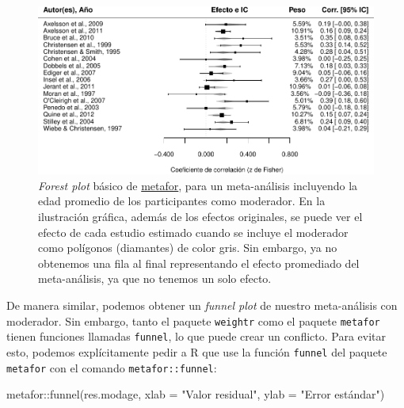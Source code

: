 \documentclass[
  bookmarksnumbered]{article}
\newenvironment{Shaded}{\begin{snugshade}}{\end{snugshade}}
\newcommand{\AttributeTok}[1]{\textcolor[rgb]{0.00,0.34,0.68}{#1}}
\newcommand{\FunctionTok}[1]{\textcolor[rgb]{0.39,0.29,0.61}{#1}}
\newcommand{\NormalTok}[1]{\textcolor[rgb]{0.12,0.11,0.11}{#1}}
\newcommand{\SpecialCharTok}[1]{\textcolor[rgb]{0.24,0.68,0.91}{#1}}
\newcommand{\StringTok}[1]{\textcolor[rgb]{0.75,0.01,0.01}{#1}}
\begin{document}
\begin{figure}
\centering
\includegraphics{Meta-analysis_files/figure-latex/for-plot-mod1-1.pdf}
\caption{\label{fig:for-plot-mod1}\emph{Forest plot} básico de \href{https://www.metafor-project.org/doku.php}{metafor}, para un meta-análisis incluyendo la edad promedio de los participantes como moderador. En la ilustración gráfica, además de los efectos originales, se puede ver el efecto de cada estudio estimado cuando se incluye el moderador como polígonos (diamantes) de color gris. Sin embargo, ya no obtenemos una fila al final representando el efecto promediado del meta-análisis, ya que no tenemos un solo efecto.}
\end{figure}

De manera similar, podemos obtener un \emph{funnel plot} de nuestro meta-análisis con moderador. Sin embargo, tanto el paquete \texttt{weightr} como el paquete \texttt{metafor} tienen funciones llamadas \texttt{funnel}, lo que puede crear un conflicto. Para evitar esto, podemos explícitamente pedir a R que use la función \texttt{funnel} del paquete \texttt{metafor} con el comando \texttt{metafor::funnel}:

\begin{Shaded}
\begin{Highlighting}[]
\NormalTok{metafor}\SpecialCharTok{::}\FunctionTok{funnel}\NormalTok{(res.modage, }\AttributeTok{xlab =} \StringTok{"Valor residual"}\NormalTok{, }\AttributeTok{ylab =} \StringTok{"Error estándar"}\NormalTok{)}
\end{Highlighting}
\end{Shaded}
\end{document}
